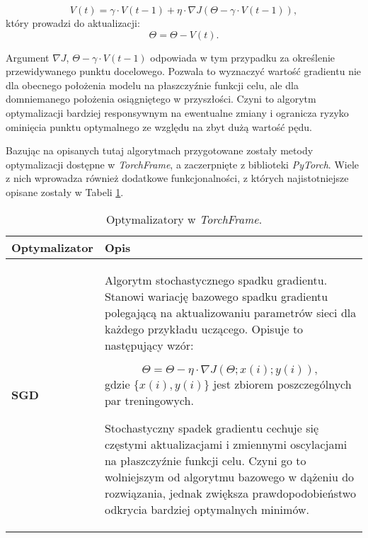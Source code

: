 \begin{enumerate}
    \begin{equation}
    V(t)=\gamma \cdot V(t - 1) + \eta \cdot \nabla J(\Theta - \gamma \cdot V(t - 1)),
  \end{equation}
    który prowadzi do aktualizacji:
    \begin{equation}
    \Theta = \Theta - V(t).
  \end{equation}

    Argument $\nabla J$, $\Theta - \gamma \cdot V(t - 1)$ odpowiada w tym przypadku za określenie przewidywanego punktu docelowego.
    Pozwala to wyznaczyć wartość gradientu nie dla obecnego położenia modelu na płaszczyźnie
    funkcji celu, ale dla domniemanego położenia osiągniętego w przyszłości. Czyni to
    algorytm optymalizacji bardziej responsywnym na ewentualne zmiany i ogranicza ryzyko
    ominięcia punktu optymalnego ze względu na zbyt dużą wartość pędu.

    Bazując na opisanych tutaj algorytmach przygotowane zostały metody optymalizacji
    dostępne w \textit{TorchFrame}, a zaczerpnięte z biblioteki \textit{PyTorch}. Wiele z nich wprowadza
    również dodatkowe funkcjonalności, z których najistotniejsze opisane zostały w Tabeli \ref{tab:optimizers}.

  \begin{small}
    \begin{longtable}{ |m{2cm}|m{12cm}| }
      \caption{Optymalizatory w \textit{TorchFrame}.}
      \label{tab:optimizers}
      \endfirsthead
      \endhead
     \hline
       \textbf{Optymalizator} & \textbf{Opis} \\

     \hline
       \textbf{SGD \cite{SGD}} &

       Algorytm stochastycznego spadku gradientu. Stanowi wariację bazowego spadku
       gradientu polegającą na aktualizowaniu parametrów sieci dla
       każdego przykładu uczącego. Opisuje to następujący wzór:

       \begin{equation}
       \Theta = \Theta - \eta \cdot \nabla J(\Theta;x(i);y(i)),
     \end{equation}
       gdzie $\{x(i), y(i)\}$ jest zbiorem poszczególnych par treningowych.

       Stochastyczny spadek gradientu cechuje się częstymi aktualizacjami i
       zmiennymi oscylacjami na płaszczyźnie funkcji celu. Czyni go to wolniejszym od
       algorytmu bazowego w dążeniu do rozwiązania, jednak zwiększa prawdopodobieństwo odkrycia
       bardziej optymalnych minimów.


\end{longtable}
\end{small}
\end{enumerate}
